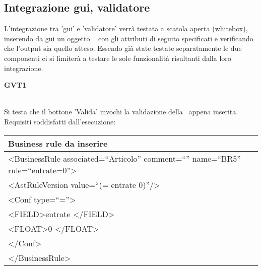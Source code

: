 \subsection{Integrazione gui, validatore}
L'integrazione tra 'gui' e 'validatore' verr\`a testata a scatola aperta (\underline{whitebox}), inserendo da gui  un oggetto \textit{\br\ } con gli attributi di seguito specificati e verificando che l'output sia quello atteso. Essendo gi\`a state testate separatamente le due componenti ci si limiter\`a a testare le sole funzionalit\`a risultanti dalla loro integrazione.\\

\begin{Large}\textbf{GVT1}\end{Large} \\
Si testa che il bottone 'Valida' invochi la validazione della \br\ appena inserita.
Requisiti soddisfatti dall'esecuzione: \\
\begin{center}
\begin{tabular}{|p{11cm}|} \hline
\textbf{Business rule da inserire}\\ \hline
\textless BusinessRule associated=``Articolo'' comment=``'' name=``BR5'' rule=``entrate=0''\textgreater \\
\textless AstRuleVersion value=``(= entrate 0)''/\textgreater \\
 \textless Conf type=``=''\textgreater \\
 \textless FIELD\textgreater entrate \textless /FIELD\textgreater \\
 \textless FLOAT\textgreater 0 \textless /FLOAT\textgreater \\
 \textless /Conf\textgreater \\
\textless /BusinessRule\textgreater \\ \hline
\end{tabular} \\
\end{center}


